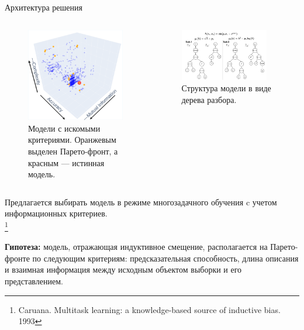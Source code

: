 \documentclass{beamer}
\newcommand\blfootnote[1]{%
\begingroup
\renewcommand\thefootnote{}\footnote{#1}%
\addtocounter{footnote}{-1}%
\endgroup
}
\begin{document}
\begin{frame}{Архитектура решения}
\begin{columns}[c]
\begin{figure}
    \includegraphics[scale=0.13]{3d_paretto_front.pdf}
    \caption{\scriptsize Модели с искомыми критериями. Оранжевым выделен Парето-фронт, а красным --- истинная модель.}
\end{figure}
\begin{figure}
    \includegraphics[width=0.9\textwidth]{expression_tree.drawio.pdf}
    \caption{\scriptsize Структура модели в виде дерева разбора.}
\end{figure}
\end{columns}
{\scriptsize \setlength{\baselineskip}{\baselineskip} Предлагается выбирать модель в режиме многозадачного обучения c учетом информационных критериев.\\}\blfootnote{\scriptsize Caruana. Multitask learning: a knowledge-based source of inductive bias. 1993}
{\scriptsize \setlength{\baselineskip}{\baselineskip} \textbf{Гипотеза:} модель, отражающая индуктивное смещение, располагается на Парето-фронте по следующим критериям: предсказательная способность, длина описания и взаимная информация между исходным объектом выборки и его представлением.\\}
\end{frame}
\end{document}
